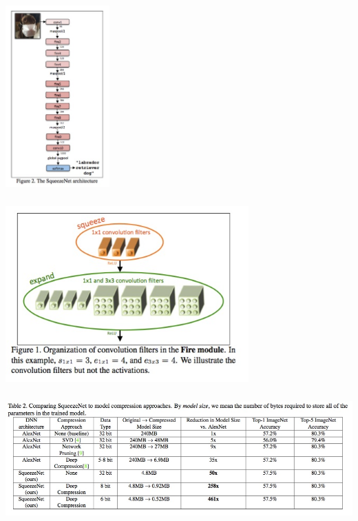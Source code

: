 \documentclass[xetex,mathserif,serif,aspectratio=169]{beamer}
\begin{document}
\begin{frame}[fragile] \frametitle{} \oldB \small

\begin{center}
\includegraphics[width=0.3\textwidth]{img/squeezeNetModel.jpg}
\end{center}

\end{frame}

\begin{frame}[fragile] \frametitle{} \oldB \small

\begin{center}
\includegraphics[width=0.7\textwidth]{img/squeezeNetFire.jpg}
\end{center}

\end{frame}

\begin{frame}[fragile] \frametitle{} \oldB \small

\begin{center}
\includegraphics[width=\textwidth]{img/squeezeNetResults.jpg}
\end{center}

\end{frame}
\end{document}
